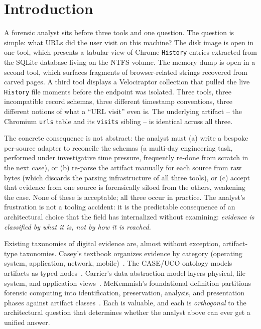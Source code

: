 \section{Introduction}
\label{sec:introduction}

A forensic analyst sits before three tools and one question. The question is
simple: what URLs did the user visit on this machine? The disk image is open
in one tool, which presents a tabular view of Chrome \texttt{History} entries
extracted from the SQLite database living on the NTFS volume. The memory
dump is open in a second tool, which surfaces fragments of browser-related
strings recovered from carved pages. A third tool displays a Velociraptor
collection that pulled the live \texttt{History} file moments before the
endpoint was isolated. Three tools, three incompatible record schemas, three
different timestamp conventions, three different notions of what a ``URL
visit'' even is. The underlying artifact -- the Chromium \texttt{urls} table
and its \texttt{visits} sibling -- is identical across all three.

The concrete consequence is not abstract: the analyst must (a) write a
bespoke per-source adapter to reconcile the schemas (a multi-day engineering
task, performed under investigative time pressure, frequently re-done from
scratch in the next case), or (b) re-parse the artifact manually for each
source from raw bytes (which discards the parsing infrastructure of all
three tools), or (c) accept that evidence from one source is forensically
siloed from the others, weakening the case. None of these is acceptable; all
three occur in practice. The analyst's frustration is not a tooling
accident: it is the predictable consequence of an architectural choice that
the field has internalized without examining: \emph{evidence is classified
by what it is, not by how it is reached.}

Existing taxonomies of digital evidence are, almost without exception,
artifact-type taxonomies. Casey's textbook organizes evidence by category
(operating system, application, network, mobile)~\cite{casey2011digital}.
The CASE/UCO ontology models artifacts as typed
nodes~\cite{caseuco2018,casey2017advancing}. Carrier's data-abstraction
model layers physical, file system, and application
views~\cite{carrier2003getting,carrier2005file}. McKemmish's foundational
definition partitions forensic computing into identification, preservation,
analysis, and presentation phases against artifact
classes~\cite{mckemmish1999forensic}. Each is valuable, and each is
\emph{orthogonal} to the architectural question that determines whether the
analyst above can ever get a unified answer.


